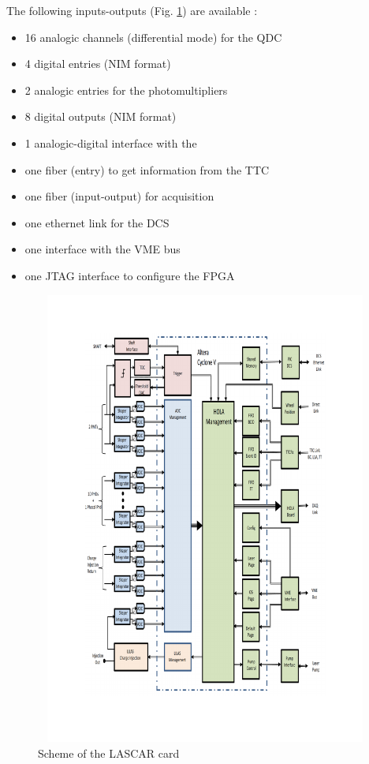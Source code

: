 The following inputs-outputs (Fig. \ref{fig:laslascarlinks}) are available :
\begin{itemize}
\item 16 analogic channels (differential mode) for the QDC
\item 4 digital entries (NIM format)
\item 2 analogic entries for the photomultipliers
\item 8 digital outputs (NIM format)
\item 1 analogic-digital interface with the \las
\item one fiber (entry) to get information from the TTC
\item one fiber (input-output) for acquisition
\item one ethernet link for the DCS
\item one interface with the VME bus
\item one JTAG interface to configure the FPGA

\end{itemize}

\begin{figure}[htbp]

\centering
\includegraphics[height=15cm,width=15cm]{figures/Lascarlinks.pdf}
\caption{Scheme of the LASCAR card}\label{fig:laslascarlinks}
\end{figure}


